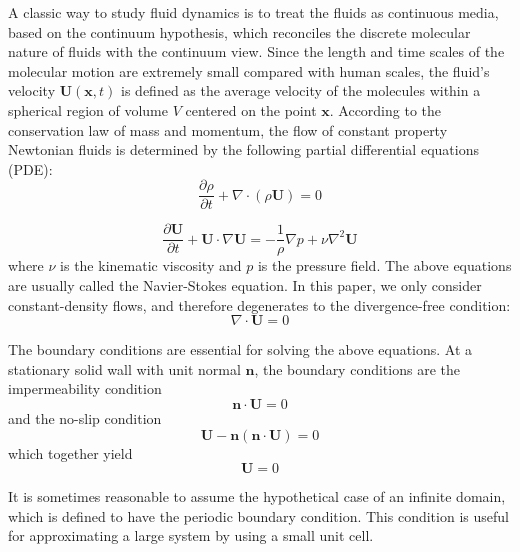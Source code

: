 A classic way to study fluid dynamics is to treat 
the fluids as continuous media, based on the continuum hypothesis, 
which reconciles the discrete molecular nature of fluids with the 
continuum view. Since the length and time scales of the molecular 
motion are extremely small compared with human scales, the fluid's velocity $\mathbf{U}(\mathbf{x}, t)$ is defined as the average velocity of the molecules within a spherical region of 
volume $V$ centered on the point $\mathbf{x}$. According to the conservation law of mass and momentum, the flow of constant property Newtonian fluids is determined by the 
following partial differential equations (PDE):
\begin{equation}
\frac{\partial\rho}{\partial t} + \nabla\cdot(\rho\mathbf{U}) = 0
\label{mass_eqn}
\end{equation} 

\begin{equation}
\frac{\partial\mathbf{U}}{\partial t} 
+ \mathbf{U}\cdot\nabla\mathbf{U} 
= -\frac{1}{\rho}\nabla p + \nu\nabla^2\mathbf{U}
\label{mom_eqn}
\end{equation}
where $\nu$ is the kinematic viscosity and $p$ is the pressure field. The above equations are usually called the Navier-Stokes equation. In this paper, we only consider constant-density flows, and therefore  degenerates to the divergence-free condition:
\begin{equation}
\nabla\cdot\mathbf{U} = 0
\label{div_free}
\end{equation}

The boundary conditions are essential for solving the above equations. At a stationary solid wall with unit normal $\mathbf{n}$, 
the boundary conditions are the impermeability condition
\begin{equation}
\mathbf{n}\cdot\mathbf{U} = 0
\label{imperm_cond}
\end{equation}
and the no-slip condition
\begin{equation}
\mathbf{U}-\mathbf{n}(\mathbf{n}\cdot\mathbf{U}) = 0
\label{noslip_cond}
\end{equation}
which together yield
\begin{equation}
\mathbf{U} = 0
\label{stat_cond}
\end{equation}

It is sometimes reasonable to assume the hypothetical case of an infinite domain, which is defined to have the periodic boundary condition. This condition is useful for approximating a large system by using a small unit cell.

